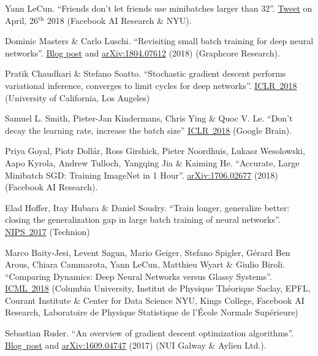 \documentclass{article}
\begin{document}
\begin{thebibliography}{10}
 Yann LeCun. ``Friends don't let friends use minibatches larger than 32''. \href{https://twitter.com/ylecun/status/989610208497360896}{Tweet} on April, 26$^\text{th}$ 2018 (Facebook AI Research \& NYU).

 Dominic Masters \& Carlo Luschi. ``Revisiting small batch training for deep neural networks''. \href{https://www.graphcore.ai/posts/revisiting-small-batch-training-for-deep-neural-networks}{Blog post} and \href{https://arxiv.org/pdf/1804.07612.pdf}{arXiv:1804.07612} (2018) (Graphcore Research).

 Pratik Chaudhari \& Stefano Soatto. ``Stochastic gradient descent performs variational inference, converges to limit cycles for deep networks''. \href{https://openreview.net/pdf?id=HyWrIgW0W}{ICLR~2018} (University of California, Los Angeles)

 Samuel L. Smith, Pieter-Jan Kindermans, Chris Ying \& Quoc V. Le.  ``Don't decay the learning rate, increase the batch size'' \href{https://openreview.net/pdf?id=B1Yy1BxCZ}{ICLR~2018} (Google Brain).

 Priya Goyal, Piotr Doll\'ar, Ross Girshick, Pieter Noordhuis, Lukasz Wesolowski, Aapo Kyrola, Andrew Tulloch, Yangqing Jia \& Kaiming He.  ``Accurate, Large Minibatch SGD: Training ImageNet in 1 Hour''. \href{https://arxiv.org/abs/1706.02677}{arXiv:1706.02677} (2018) (Facebook AI Research).

 Elad Hoffer, Itay Hubara \& Daniel Soudry. ``Train longer, generalize better: closing the generalization gap in large batch training of neural networks''. \href{https://arxiv.org/pdf/1705.08741.pdf}{NIPS~2017} (Technion)

 Marco Baity-Jesi, Levent Sagun, Mario Geiger, Stefano Spigler, G\'erard Ben Arous, Chiara Cammarota, Yann LeCun, Matthieu Wyart \& Giulio Biroli. ``Comparing Dynamics: Deep Neural Networks versus Glassy Systems''. \href{https://arxiv.org/pdf/1803.06969.pdf}{ICML~2018} (Columbia University, Institut de Physique Th\'eorique Saclay, EPFL, Courant Institute \& Center for Data Science NYU, Kings College, Facebook AI Research, Laboratoire de Physique Statistique de l'\'Ecole Normale Sup\'erieure)

 Sebastian Ruder. ``An overview of gradient descent optimization algorithms''.  \href{http://ruder.io/optimizing-gradient-descent/}{Blog~post} and \href{https://arxiv.org/abs/1609.04747}{arXiv:1609.04747} (2017) (NUI Galway \& Aylien Ltd.).


\end{thebibliography}
\end{document}
